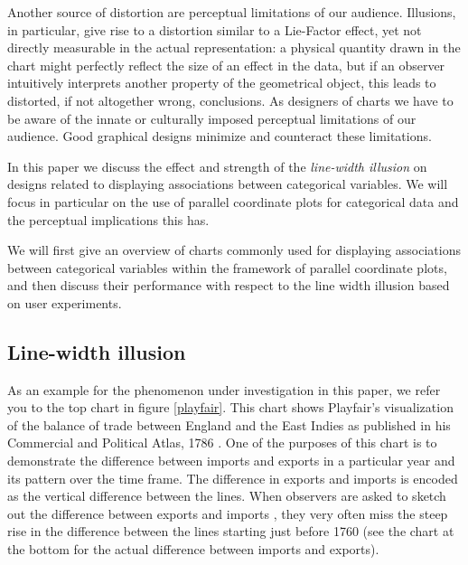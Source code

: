 Another source of distortion are perceptual limitations of our audience. Illusions, in particular, give rise to a distortion similar to a Lie-Factor effect, yet not directly measurable in the actual representation: a physical quantity drawn in the chart might  perfectly reflect the  size of an effect in the data, but if an observer  intuitively interprets another property of the geometrical object, this leads  to distorted, if not altogether wrong, conclusions. 
As designers of charts we have to be aware of the innate or culturally imposed perceptual limitations of our audience. Good graphical designs minimize and counteract these limitations. 

In this paper we discuss the effect and strength of the {\it line-width illusion}  on designs related to displaying associations between categorical variables. We will focus in particular on the use of parallel coordinate plots \citep{pcp:1885, inselberg:1985, wegman:1990} for categorical data and the perceptual implications this has.

We will first give an overview of  charts commonly used for displaying associations between categorical variables within the framework of parallel coordinate plots, and then discuss their performance with respect to the line width illusion based on user experiments.
%


\subsection{Line-width illusion}
As an example for the phenomenon under investigation in this paper, we refer you to the top chart in  figure  \ref{playfair}. 
This chart shows Playfair's  visualization of the balance of trade between England and the East Indies as published in his Commercial and Political Atlas, 1786 \cite{playfair, playfair2}. One of the purposes of this chart is to demonstrate the difference between imports and exports in a particular year and its pattern over the time frame. The difference in exports and imports is encoded as the vertical difference between the lines. When observers are asked to sketch out the difference between exports and imports  \citep{cleveland:1984}, they very often  miss the steep rise in the difference between the lines starting just before 1760 (see the chart at the bottom for the actual difference between imports and exports).


